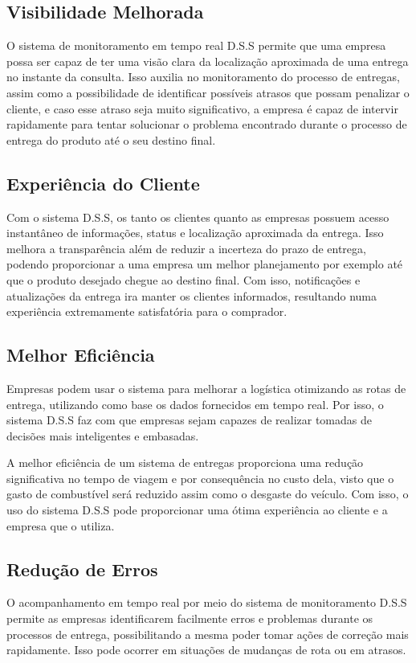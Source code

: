         \subsection{Visibilidade Melhorada}
        O sistema de monitoramento em tempo real D.S.S permite que uma empresa possa ser capaz de ter uma visão clara da localização aproximada de uma entrega no instante da consulta. Isso auxilia no monitoramento do processo de entregas, assim como a possibilidade de identificar possíveis atrasos que possam penalizar o cliente, e caso esse atraso seja muito significativo, a empresa é capaz de intervir rapidamente para tentar solucionar o problema encontrado durante o processo de entrega do produto até o seu destino final.
        
        
        \subsection{Experiência do Cliente} 
	Com o sistema D.S.S, os tanto os clientes quanto as empresas possuem acesso instantâneo de informações, status e localização aproximada da entrega. Isso melhora a transparência além de reduzir a incerteza do prazo de entrega, podendo proporcionar a uma empresa um melhor planejamento por exemplo até que o produto desejado chegue ao destino final. Com isso, notificações e atualizações da entrega ira manter os clientes informados, resultando numa experiência extremamente satisfatória para o comprador.

        \subsection{Melhor Eficiência}
    Empresas podem usar o sistema para melhorar a logística otimizando as rotas de entrega, utilizando como base os dados fornecidos em tempo real. Por isso, o sistema D.S.S faz com que empresas sejam capazes de realizar tomadas de decisões mais inteligentes e embasadas.
    
    A melhor eficiência de um sistema de entregas proporciona uma redução significativa no tempo de viagem e por consequência no custo dela, visto que o gasto de combustível será reduzido assim como o desgaste do veículo. Com isso, o uso do sistema D.S.S pode proporcionar uma ótima experiência ao cliente e a empresa que o utiliza.
    
    \subsection{Redução de Erros}
    O acompanhamento em tempo real por meio do sistema de monitoramento D.S.S permite as empresas identificarem facilmente erros e problemas durante os processos de entrega, possibilitando a mesma poder tomar ações de correção mais rapidamente. Isso pode ocorrer em situações de mudanças de rota ou em atrasos.
    
